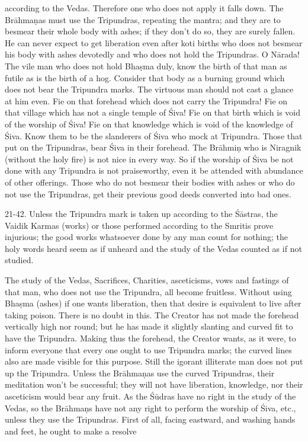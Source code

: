 according to the Vedas. Therefore one who does not apply it falls down. The Br\=ahma\d{n}as must use the Tripundras, repeating the mantra; and they are to besmear their whole body with ashes; if they don't do so, they are surely fallen. He can never expect to get liberation even after koti births who does not besmear his body with ashes devotedly and who does not hold the Tripundras. O N\=arada! The vile man who does not hold Bha\d{s}ma duly, know the birth of that man as futile as is the birth of a hog. Consider that body as a burning ground which does not bear the Tripundra marks. The virtuous man should not cast a glance at him even. Fie on that forehead which does not carry the Tripundra! Fie on that village which has not a single temple of \'Siva! Fie on that birth which is void of the worship of \'Siva! Fie on that knowledge which is void of the knowledge of \'Siva. Know them to be the slanderers of \'Siva who mock at Tripundra. Those that put on the Tripundras, bear \'Siva in their forehead. The Br\=ahmi\d{n} who is Niragnik (without the holy fire) is not nice in every way. So if the worship of \'Siva be not done with any Tripundra is not praiseworthy, even it be attended with abundance of other offerings. Those who do not besmear their bodies with ashes or who do not use the Tripundras, get their previous good deeds converted into bad ones.

21-42. Unless the Tripundra mark is taken up according to the \'S\=astras, the Vaidik Karmas (works) or those performed according to the Smritis prove injurious; the good works whatsoever done by any man count for nothing; the holy words heard seem as if unheard and the study of the Vedas counted as if not studied.

The study of the Vedas, Sacrifices, Charities, asceticisms, vows and fastings of that man, who does not use the Tripundra, all become fruitless. Without using Bha\d{s}ma (ashes) if one wants liberation, then that desire is equivalent to live after taking poison. There is no doubt in this. The Creator has not made the forehead vertically high nor round; but he has made it slightly slanting and curved fit to have the Tripundra. Making thus the forehead, the Creator wants, as it were, to inform everyone that every one ought to use Tripundra marks; the curved lines also are made visible for this purpose. Still the igorant illiterate man does not put up the Tripundra. Unless the Br\=ahma\d{n}as use the curved Tripundras, their meditation won't be successful; they will not have liberation, knowledge, nor their asceticism would bear any fruit. As the \'S\=udras have no right in the study of the Vedas, so the Br\=ahma\d{n}s have not any right to perform the worship of \'Siva, etc., unless they use the Tripundras. First of all, facing eastward, and washing hands and feet, he ought to make a resolve

